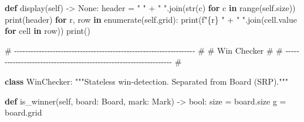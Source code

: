 \documentclass[11pt]{article}
\newenvironment{Shaded}{\begin{snugshade}}{\end{snugshade}}
\newcommand{\BuiltInTok}[1]{\textcolor[rgb]{0.50,0.55,0.55}{#1}}
\newcommand{\CommentTok}[1]{\textcolor[rgb]{0.48,0.49,0.49}{#1}}
\newcommand{\ControlFlowTok}[1]{\textcolor[rgb]{0.99,0.74,0.29}{\textbf{#1}}}
\newcommand{\KeywordTok}[1]{\textcolor[rgb]{0.81,0.81,0.76}{\textbf{#1}}}
\newcommand{\NormalTok}[1]{\textcolor[rgb]{0.81,0.81,0.76}{#1}}
\newcommand{\OperatorTok}[1]{\textcolor[rgb]{0.81,0.81,0.76}{#1}}
\newcommand{\SpecialCharTok}[1]{\textcolor[rgb]{0.24,0.68,0.91}{#1}}
\newcommand{\SpecialStringTok}[1]{\textcolor[rgb]{0.85,0.27,0.33}{#1}}
\newcommand{\StringTok}[1]{\textcolor[rgb]{0.96,0.31,0.31}{#1}}
\newcommand{\VariableTok}[1]{\textcolor[rgb]{0.15,0.68,0.68}{#1}}
\begin{document}
\begin{Shaded}
\begin{Highlighting}[]
    \KeywordTok{def}\NormalTok{ display(}\VariableTok{self}\NormalTok{) }\OperatorTok{{-}\textgreater{}} \VariableTok{None}\NormalTok{:}
\NormalTok{        header }\OperatorTok{=} \StringTok{"  "} \OperatorTok{+} \StringTok{" "}\NormalTok{.join(}\BuiltInTok{str}\NormalTok{(c) }\ControlFlowTok{for}\NormalTok{ c }\KeywordTok{in} \BuiltInTok{range}\NormalTok{(}\VariableTok{self}\NormalTok{.size))}
        \BuiltInTok{print}\NormalTok{(header)}
        \ControlFlowTok{for}\NormalTok{ r, row }\KeywordTok{in} \BuiltInTok{enumerate}\NormalTok{(}\VariableTok{self}\NormalTok{.grid):}
            \BuiltInTok{print}\NormalTok{(}\SpecialStringTok{f"}\SpecialCharTok{\{}\NormalTok{r}\SpecialCharTok{\}}\SpecialStringTok{ "} \OperatorTok{+} \StringTok{" "}\NormalTok{.join(cell.value }\ControlFlowTok{for}\NormalTok{ cell }\KeywordTok{in}\NormalTok{ row))}
        \BuiltInTok{print}\NormalTok{()}


\CommentTok{\# {-}{-}{-}{-}{-}{-}{-}{-}{-}{-}{-}{-}{-}{-}{-}{-}{-}{-}{-}{-}{-}{-}{-}{-}{-}{-}{-}{-}{-}{-}{-}{-}{-}{-}{-}{-}{-}{-}{-}{-}{-}{-}{-}{-}{-}{-}{-}{-}{-}{-}{-}{-}{-}{-}{-}{-}{-}{-}{-}{-}{-}{-}{-}{-}{-}{-} \#}
\CommentTok{\# Win Checker                                                         \#}
\CommentTok{\# {-}{-}{-}{-}{-}{-}{-}{-}{-}{-}{-}{-}{-}{-}{-}{-}{-}{-}{-}{-}{-}{-}{-}{-}{-}{-}{-}{-}{-}{-}{-}{-}{-}{-}{-}{-}{-}{-}{-}{-}{-}{-}{-}{-}{-}{-}{-}{-}{-}{-}{-}{-}{-}{-}{-}{-}{-}{-}{-}{-}{-}{-}{-}{-}{-}{-} \#}

\KeywordTok{class}\NormalTok{ WinChecker:}
    \CommentTok{"""Stateless win{-}detection. Separated from Board (SRP)."""}

    \KeywordTok{def}\NormalTok{ is\_winner(}\VariableTok{self}\NormalTok{, board: Board, mark: Mark) }\OperatorTok{{-}\textgreater{}} \BuiltInTok{bool}\NormalTok{:}
\NormalTok{        size }\OperatorTok{=}\NormalTok{ board.size}
\NormalTok{        g }\OperatorTok{=}\NormalTok{ board.grid}


\end{Highlighting}
\end{Shaded}
\end{document}
